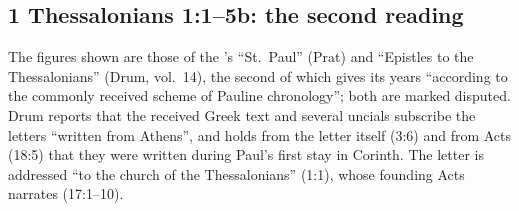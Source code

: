 \subsection{1 Thessalonians 1:1--5b: the second reading}
\label{sec:date-thessalonians}

The figures shown are those of the 's ``St.~Paul''
(Prat) and ``Epistles to the Thessalonians'' (Drum, vol.~14), the second of
which gives its years ``according to the commonly received scheme of Pauline
chronology''; both are marked disputed. Drum reports that the received Greek
text and several uncials subscribe the letters ``written from Athens'', and
holds from the letter itself (3:6) and from Acts (18:5) that they were written
during Paul's first stay in Corinth. The letter is addressed ``to the church of
the Thessalonians'' (1:1), whose founding Acts narrates (17:1--10).
